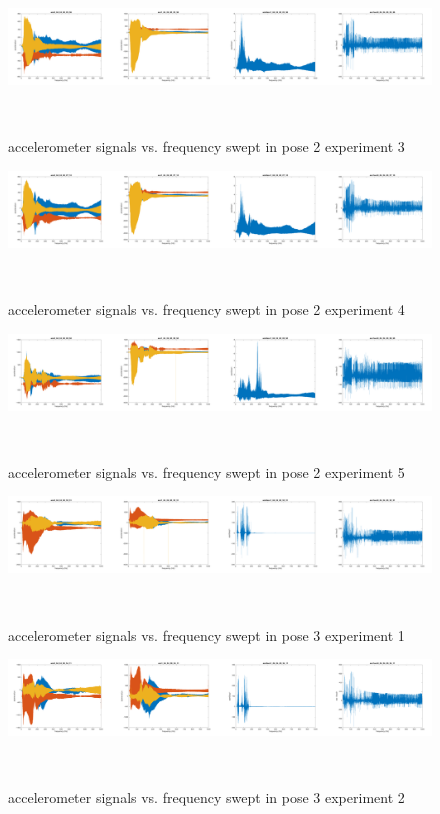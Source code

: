 \documentclass{sigchi}
\begin{document}
\begin{figure}
  \centering
  \includegraphics[width=1.95\columnwidth]{figures/pose2_3}
  \caption{accelerometer signals vs. frequency swept in pose 2 experiment 3}
    ~\label{fig:pose2_3}
\end{figure}

\begin{figure}
  \centering
  \includegraphics[width=1.95\columnwidth]{figures/pose2_4}
  \caption{accelerometer signals vs. frequency swept in pose 2 experiment 4}
    ~\label{fig:pose2_4}
\end{figure}

\begin{figure}
  \centering
  \includegraphics[width=1.95\columnwidth]{figures/pose2_5}
  \caption{accelerometer signals vs. frequency swept in pose 2 experiment 5}
    ~\label{fig:pose2_5}
\end{figure}

\begin{figure}
  \centering
  \includegraphics[width=1.95\columnwidth]{figures/pose3_1}
  \caption{accelerometer signals vs. frequency swept in pose 3 experiment 1}
    ~\label{fig:pose3_1}
\end{figure}

\begin{figure}
  \centering
  \includegraphics[width=1.95\columnwidth]{figures/pose3_2}
  \caption{accelerometer signals vs. frequency swept in pose 3 experiment 2}
    ~\label{fig:pose3_2}
\end{figure}
\end{document}
